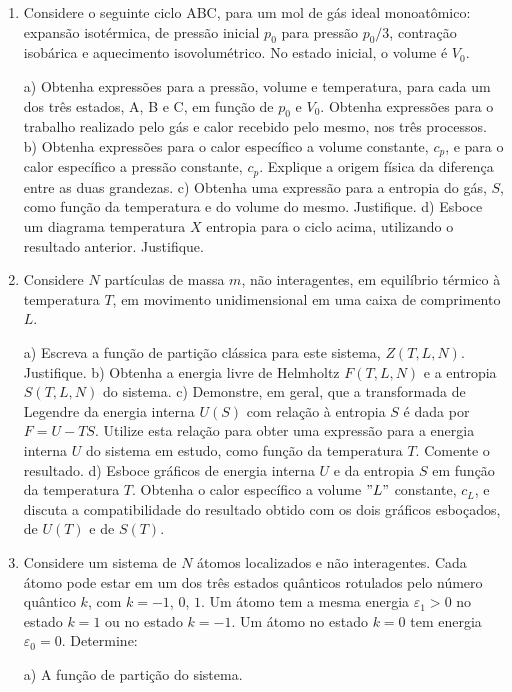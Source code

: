 \begin{enumerate}[start=1,label={\bfseries Q\arabic*.}]
\item Considere o seguinte ciclo ABC, para um mol de gás ideal monoatômico: expansão isotérmica, de pressão inicial $p_{0}$ para pressão $p_{0}/3$, contração isobárica e aquecimento isovolumétrico. No estado inicial, o volume é $V_{0}$.

a) Obtenha expressões para a pressão, volume e temperatura, para cada um dos três estados, A, B e C, em função de $p_{0}$ e $V_{0}$. Obtenha expressões para o trabalho realizado pelo gás e calor recebido pelo mesmo, nos três processos.
b) Obtenha expressões para o calor específico a volume constante, $c_{p}$, e para o calor específico a pressão constante, $c_{p}$. Explique a origem física da diferença entre as duas grandezas.
c) Obtenha uma expressão para a entropia do gás, $S$, como função da temperatura e do volume do mesmo. Justifique.
d) Esboce um diagrama temperatura $X$ entropia para o ciclo acima, utilizando o resultado anterior. Justifique.




\item Considere $N$ partículas de massa $m$, não interagentes, em equilíbrio térmico à temperatura $T$, em movimento unidimensional em uma caixa de comprimento $L$.

a) Escreva a função de partição clássica para este sistema, $Z(T,L,N)$. Justifique.
b) Obtenha a energia livre de Helmholtz $F(T,L,N)$ e a entropia $S(T,L,N)$ do sistema.
c) Demonstre, em geral, que a transformada de Legendre da energia interna $U(S)$ com relação à entropia $S$ é dada por $ F = U - TS $. Utilize esta relação para obter uma expressão para a energia interna $U$ do sistema em estudo, como função da temperatura $T$. Comente o resultado.
d) Esboce gráficos de energia interna $U$ e da entropia $S$ em função da temperatura $T$. Obtenha o calor específico a volume $"L"$ constante, $c_{L}$, e discuta a compatibilidade do resultado obtido com os dois gráficos esboçados, de $U(T)$ e de $S(T)$.






\item Considere um sistema de $N$ átomos localizados e não interagentes. Cada átomo pode estar em um dos três estados quânticos rotulados pelo número quântico $k$, com $k = -1$, $0$, $1$. Um átomo tem a mesma energia $\varepsilon_{1} > 0$ no estado $k = 1$ ou no estado $k = -1$. Um átomo no estado $k = 0$ tem energia $\varepsilon_{0} = 0$. Determine:

a) A função de partição do sistema.


\end{enumerate}
